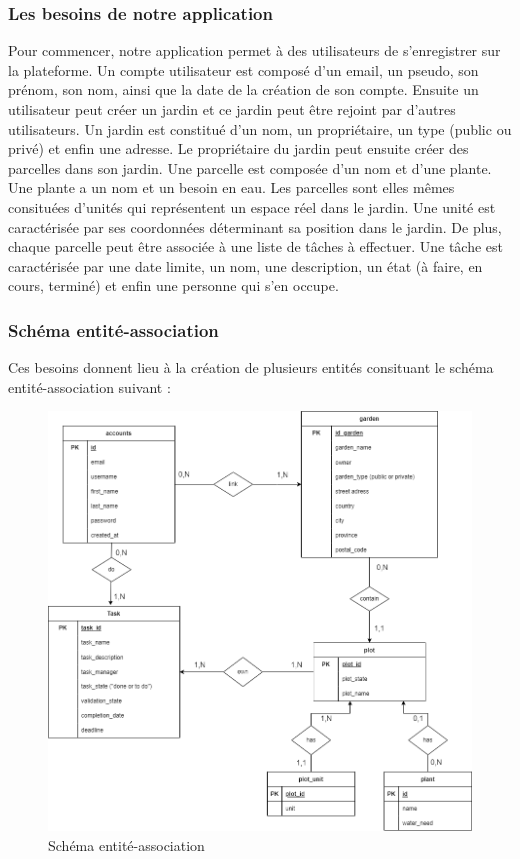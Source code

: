 \documentclass[french,a4paper]{article}
\begin{document}
\subsubsection{Les besoins de notre application}
Pour commencer, notre application permet à des utilisateurs de s'enregistrer sur la plateforme. Un compte utilisateur est composé d'un
email, un pseudo, son prénom, son nom, ainsi que la date de la création de son compte. Ensuite un utilisateur peut créer un jardin
et ce jardin peut être rejoint par d'autres utilisateurs.
Un jardin est constitué d'un nom, un propriétaire, un type (public ou privé) et enfin une adresse. Le propriétaire du jardin peut
ensuite créer des parcelles dans son jardin. Une parcelle est composée d'un nom et d'une plante. Une plante a un nom et un besoin en eau. Les parcelles sont elles mêmes consituées
d'unités qui représentent un espace réel dans le jardin. Une unité est caractérisée par ses coordonnées déterminant sa position dans le jardin.
De plus, chaque parcelle peut être associée à une liste de tâches à effectuer. Une tâche est caractérisée par une date limite, un nom,
une description, un état (à faire, en cours, terminé) et enfin une personne qui s'en occupe.

\subsubsection{Schéma entité-association}

Ces besoins donnent lieu à la création de plusieurs entités consituant le schéma entité-association suivant :

\begin{figure}[H]
    \centering
    \includegraphics[width=1\textwidth]{img/Schema_entite_association_PPIIversion2.drawio.png}
    \caption{Schéma entité-association}
\end{figure}
\end{document}
